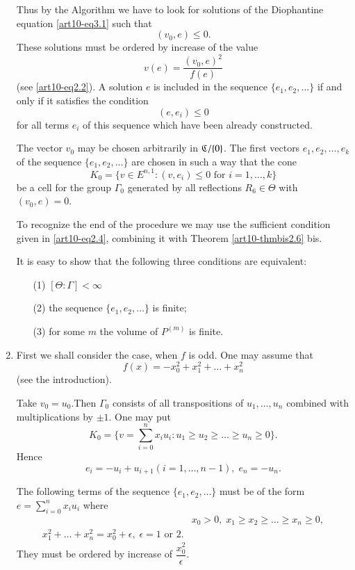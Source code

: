 \begin{enumerate}
Thus by the Algorithm we have to look for solutions of the Diophantine equation \eqref{art10-eq3.1} such that
$$
(v_0, e) \leqslant 0.
$$
These solutions must be ordered by increase of the value 
$$
v(e) = \frac{(v_0, e)^2}{f(e)}
$$
(see \ref{art10-eq2.2}). A solution $e$ is included in the sequence $\{e_1, e_2, \ldots\}$ if and only if it satisfies the condition
$$
(e, e_i) \leqslant 0
$$
for all terms $e_i$ of this sequence which have been already constructed. 

The vector $v_0$ may be chosen arbitrarily in $\mathfrak{C}/\{0\}$. The first vectors $e_1, e_2, \ldots, e_k$ of the sequence $\{e_1, e_2, \ldots\}$ are chosen in such a way that the cone
$$
K_0 = \{v \in E^{n,1} : (v, e_i) \leqslant 0 \text{ for } i = 1, \ldots, k\}
$$
be a cell for the group $\Gamma_0$ generated by all reflections $R_6 \in \Theta$ with $(v_0, e) =0$.

To recognize the end of the procedure we may use the sufficient condition given in  \ref{art10-eq2.4}, combining it with Theorem \ref{art10-thmbis2.6} bis. 

It is easy to show that the following three conditions are equivalent:
\begin{itemize}
\item[(1)] $[\Theta : \Gamma] <\infty$

\item[(2)] the sequence $\{e_1, e_2, \ldots\}$ is finite;

\item[(3)] for some $m$ the volume of $P^{(m)}$ is finite.
\end{itemize}


\item  First we shall consider the case, when $f$ is odd. One may assume that
$$
f(x) = - x^2_0 + x^2_1 + \ldots + x^2_n
$$
(see the introduction).

Take $v_0 = u_0$.\pageoriginale Then $\Gamma_0$ consists of all transpositions of $u_1, \ldots, u_n$ combined with multiplications by $\pm 1$. One may put
$$
K_0 = \{v = \sum\limits^n_{i=0} x_i u_i : u_1 \geqslant u_2  \geqslant \ldots \geqslant u_n \geqslant 0\}.
$$
Hence
$$
e_i = -u_i + u_{i+1} (i = 1, \ldots, n -1 ) , \; e_n = -u_n.
$$

The following terms of the sequence $\{e_1, e_2, \ldots\}$ must be of the form $e = \sum\limits^n_{i=0} x_i u_i$ where 
\begin{align*}
& x_0 > 0, \; x_1 \geqslant x_2 \geqslant \ldots \geqslant x_n \geqslant 0,\\
x^2_1 + \ldots + x^2_n = x^2_0 + \epsilon, \; \epsilon = 1 \text{ or }2.
\end{align*}
They must be ordered by increase of $\dfrac{x^2_0}{\epsilon}$.


\end{enumerate}
